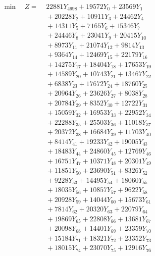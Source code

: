 \documentclass[a4paper,10pt]{article}
\begin{document}
\allowdisplaybreaks
{\small
\begin{align}
\min \quad Z = &\; 22881 Y_{4998} + 19572 Y_{0} + 23569 Y_{1} \\[0.3ex]
&\;  + 20228 Y_{2} + 10911 Y_{3} + 24462 Y_{4} \\[0.3ex]
&\;  + 14311 Y_{5} + 7165 Y_{6} + 15346 Y_{7} \\[0.3ex]
&\;  + 24446 Y_{8} + 23041 Y_{9} + 20415 Y_{10} \\[0.3ex]
&\;  + 8973 Y_{11} + 21074 Y_{12} + 9814 Y_{13} \\[0.3ex]
&\;  + 9364 Y_{14} + 12469 Y_{15} + 22179 Y_{16} \\[0.3ex]
&\;  + 14275 Y_{17} + 18404 Y_{18} + 17653 Y_{19} \\[0.3ex]
&\;  + 14589 Y_{20} + 10743 Y_{21} + 13467 Y_{22} \\[0.3ex]
&\;  + 6838 Y_{23} + 17672 Y_{24} + 18760 Y_{25} \\[0.3ex]
&\;  + 20964 Y_{26} + 23626 Y_{27} + 8038 Y_{28} \\[0.5ex]\allowbreak
&\;  + 20784 Y_{29} + 8352 Y_{30} + 12722 Y_{31} \\[0.3ex]
&\;  + 15059 Y_{32} + 16953 Y_{33} + 22952 Y_{34} \\[0.3ex]
&\;  + 22288 Y_{35} + 25503 Y_{36} + 11018 Y_{37} \\[0.3ex]
&\;  + 20372 Y_{38} + 16684 Y_{39} + 11703 Y_{40} \\[0.3ex]
&\;  + 8414 Y_{41} + 19233 Y_{42} + 19005 Y_{43} \\[0.3ex]
&\;  + 18483 Y_{44} + 24860 Y_{45} + 12769 Y_{46} \\[0.3ex]
&\;  + 16751 Y_{47} + 10371 Y_{48} + 20301 Y_{49} \\[0.3ex]
&\;  + 11851 Y_{50} + 23690 Y_{51} + 8326 Y_{52} \\[0.3ex]
&\;  + 9228 Y_{53} + 14495 Y_{54} + 18060 Y_{55} \\[0.3ex]
&\;  + 18035 Y_{56} + 10857 Y_{57} + 9622 Y_{58} \\[0.5ex]\allowbreak
&\;  + 20928 Y_{59} + 14044 Y_{60} + 15673 Y_{61} \\[0.3ex]
&\;  + 7814 Y_{62} + 20320 Y_{63} + 22079 Y_{64} \\[0.3ex]
&\;  + 19869 Y_{65} + 22808 Y_{66} + 13681 Y_{67} \\[0.3ex]
&\;  + 20098 Y_{68} + 14401 Y_{69} + 23359 Y_{70} \\[0.3ex]
&\;  + 15184 Y_{71} + 18321 Y_{72} + 23352 Y_{73} \\[0.3ex]
&\;  + 18015 Y_{74} + 23070 Y_{75} + 12916 Y_{76} \\[0.3ex]

\end{align}}
\end{document}
